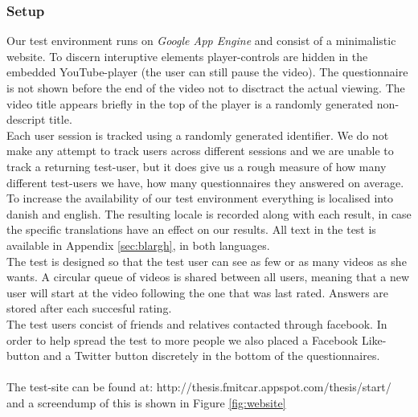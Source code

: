 \subsubsection{Setup}
%
Our test environment runs on \textit{Google App Engine} and consist of a minimalistic website. To discern interuptive elements player-controls are hidden in the embedded YouTube-player (the user can still pause the video). The questionnaire is not shown before the end of the video not to disctract the actual viewing. The video title appears briefly in the top of the player is a randomly generated non-descript title.\\
Each user session is tracked using a randomly generated identifier. We do not make any attempt to track users across different sessions and we are unable to track a returning test-user, but it does give us a rough measure of how many different test-users we have, how many questionnaires they answered on average.\\
To increase the availability of our test environment everything is localised into danish and english. The resulting locale is recorded along with each result, in case the specific translations have an effect on our results. All text in the test is available in Appendix \ref{sec:blargh}, in both languages.\\
The test is designed so that the test user can see as few or as many videos as she wants. A circular queue of videos is shared between all users, meaning that a new user will start at the video following the one that was last rated. Answers are stored after each succesful rating.\\
The test users concist of friends and relatives contacted through facebook. In order to help spread the test to more people we also placed a Facebook Like-button and a Twitter button discretely in the bottom of the questionnaires.\\\\
%
The test-site can be found at: http://thesis.fmitcar.appspot.com/thesis/start/ and a screendump of this is shown in Figure \ref{fig:website}
%
